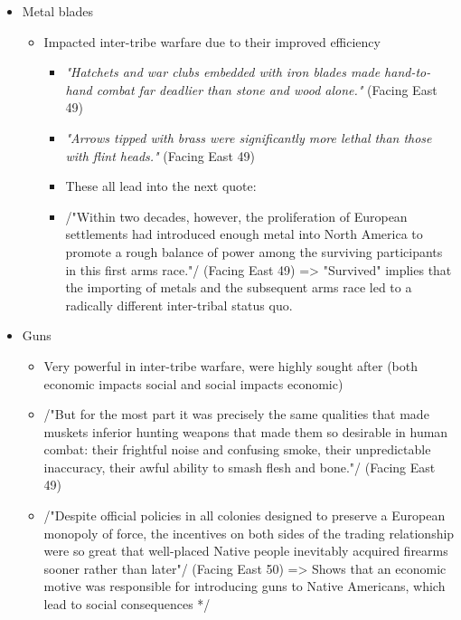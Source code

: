 \documentclass[letterpaper]{article}
\begin{document}
\begin{itemize}
\begin{itemize}
\begin{itemize}
\item Metal blades

\begin{itemize}
\item Impacted inter-tribe warfare due to their improved efficiency

\begin{itemize}
\item \emph{"Hatchets and war clubs embedded with iron blades made
hand-to-hand combat far deadlier than stone and wood alone."}
(Facing East 49)
\item \emph{"Arrows tipped with brass were significantly more lethal
than those with flint heads."} (Facing East 49)
\item These all lead into the next quote:
\item /"Within two decades, however, the proliferation of European
settlements had introduced enough metal into North America to
promote a rough balance of power among the surviving
participants in this first arms race."/ (Facing East 49) =>
"Survived" implies that the importing of metals and the
subsequent arms race led to a radically different
inter-tribal status quo.
\end{itemize}
\end{itemize}

\item Guns

\begin{itemize}
\item Very powerful in inter-tribe warfare, were highly sought after
(both economic impacts social and social impacts economic)
\item /"But for the most part it was precisely the same qualities
that made muskets inferior hunting weapons that made them so
desirable in human combat: their frightful noise and confusing
smoke, their unpredictable inaccuracy, their awful ability to
smash flesh and bone."/ (Facing East 49)
\item /"Despite official policies in all colonies designed to
preserve a European monopoly of force, the incentives on both
sides of the trading relationship were so great that
well-placed Native people inevitably acquired firearms sooner
rather than later"/ (Facing East 50) => Shows that an economic
motive was responsible for introducing guns to Native
Americans, which lead to social consequences */
\end{itemize}
\end{itemize}
\end{itemize}


\end{itemize}
\end{document}
